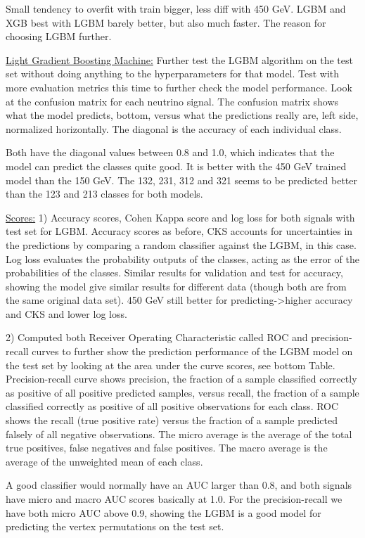 \documentclass[a4paper, american, 12pt]{report}
\begin{document}
	 Small tendency to overfit with train bigger, less diff with 450 GeV. LGBM and XGB best with LGBM barely better, but also much faster. The reason for choosing LGBM further.
	
	
	\underline{Light Gradient Boosting Machine:}
	Further test the LGBM algorithm on the test set without doing anything to the hyperparameters for that model. Test with more evaluation metrics this time to further check the model performance. Look at the confusion matrix for each neutrino signal. The confusion matrix shows what the model predicts, bottom, versus what the predictions really are, left side, normalized horizontally. The diagonal is the accuracy of each individual class.
	 
	Both have the diagonal values between 0.8 and 1.0, which indicates that the model can predict the classes quite good. It is better with the 450 GeV trained model than the 150 GeV. The 132, 231, 312 and 321 seems to be predicted better than the 123 and 213 classes for both models.
	
	
	\underline{Scores:}
	1) Accuracy scores, Cohen Kappa score and log loss for both signals with test set for LGBM. Accuracy scores as before, CKS accounts for uncertainties in the predictions by comparing a random classifier against the LGBM, in this case. Log loss evaluates the probability outputs of the classes, acting as the error of the probabilities of the classes.
	Similar results for validation and test for accuracy, showing the model give similar results for different data (though both are from the same original data set). 450 GeV still better for predicting->higher accuracy and CKS and lower log loss.
	
	2) Computed both Receiver Operating Characteristic called ROC and precision-recall curves to further show the prediction performance of the LGBM model on the test set by looking at the area under the curve scores, see bottom Table. Precision-recall curve shows precision, the fraction of a sample classified correctly as positive of all positive predicted samples, versus recall, the fraction of a sample classified correctly as positive of all positive observations for each class.  ROC shows the recall (true positive rate) versus the fraction of a sample predicted falsely of all negative observations. The micro average is the average of the total true positives, false negatives and false positives. The macro average is the average of the unweighted mean of each class.
	
	A good classifier would normally have an AUC larger than 0.8, and both signals have micro and macro AUC scores basically at 1.0. For the precision-recall we have both micro AUC above 0.9, showing the LGBM is a good model for predicting the vertex permutations on the test set.
	
\end{document}
